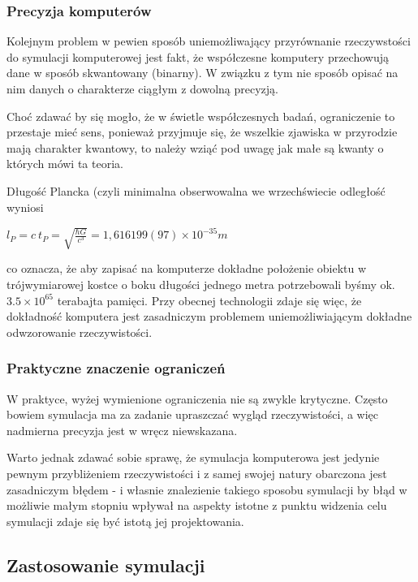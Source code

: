\subsubsection{Precyzja komputerów}
\par{
Kolejnym problem w pewien sposób uniemożliwający przyrównanie rzeczywstości do symulacji komputerowej jest fakt, że współczesne komputery przechowują dane w sposób skwantowany (binarny). W związku z tym nie sposób opisać na nim danych o charakterze ciągłym z dowolną precyzją.
}
\par{
Choć zdawać by się mogło, że w świetle współczesnych badań, ograniczenie to przestaje mieć sens, ponieważ przyjmuje się, że wszelkie zjawiska w przyrodzie mają charakter kwantowy, to należy wziąć pod uwagę jak małe są kwanty o których mówi ta teoria.
}
\par{
Długość Plancka (czyli minimalna obserwowalna we wrzechświecie odległość wyniosi 
\begin{center}
$l_P = c \ t_P = \sqrt{\frac{\hbar G}{c^3}} = 1,616 199(97) \times 10^{-35} m$
\end{center}
co oznacza, że aby zapisać na komputerze dokładne położenie obiektu w trójwymiarowej kostce o boku długości jednego metra potrzebowali byśmy ok. $3.5 \times 10^{65}$ terabajta pamięci. Przy obecnej technologii zdaje się więc, że dokładność komputera jest zasadniczym problemem uniemożliwiającym dokładne odwzorowanie rzeczywistości.
}

\subsubsection{Praktyczne znaczenie ograniczeń}
\par{
W praktyce, wyżej wymienione ograniczenia nie są zwykle krytyczne. Często bowiem symulacja ma za zadanie upraszczać wygląd rzeczywistości, a więc nadmierna precyzja jest w wręcz niewskazana.
}
\par{
Warto jednak zdawać sobie sprawę, że symulacja komputerowa jest jedynie pewnym przybliżeniem rzeczywistości i z samej swojej natury obarczona jest zasadniczym błędem - i własnie znalezienie takiego sposobu symulacji by błąd w możliwie małym stopniu wpływał na aspekty istotne z punktu widzenia celu symulacji zdaje się być istotą jej projektowania.
}

\subsection{Zastosowanie symulacji}

